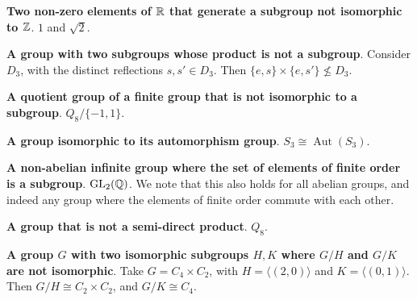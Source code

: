 \documentclass[11pt]{article}
\begin{document}
\textbf{Two non-zero elements of $\mathbb{R}$ that generate a subgroup not isomorphic to $\mathbb{Z}$}. $1$ and $\sqrt{2}$.

\textbf{A group with two subgroups whose product is not a subgroup}. Consider $D_3$, with the distinct reflections $s, s' \in D_3$. Then $\{e, s\} \times \{e, s'\} \not \leq D_3$.

\textbf{A quotient group of a finite group that is not isomorphic to a subgroup}. $Q_8 / \{-1, 1\}$.

\textbf{A group isomorphic to its automorphism group}. $S_3 \cong \operatorname{Aut}(S_3)$.

\textbf{A non-abelian infinite group where the set of elements of finite order is a subgroup}. $\operatorname{GL}_2(\mathbb{Q})$. We note that this also holds for all abelian groups, and indeed any group where the elements of finite order commute with each other.

\textbf{A group that is not a semi-direct product}. $Q_8$.

\textbf{A group $G$ with two isomorphic subgroups $H, K$ where $G/H$ and $G/K$ are not isomorphic}. Take $G = C_4 \times C_2$, with $H = \langle (2, 0) \rangle$ and $K = \langle (0, 1)\rangle$. Then $G/H \cong C_2 \times C_2$, and $G/K \cong C_4$.
\end{document}
